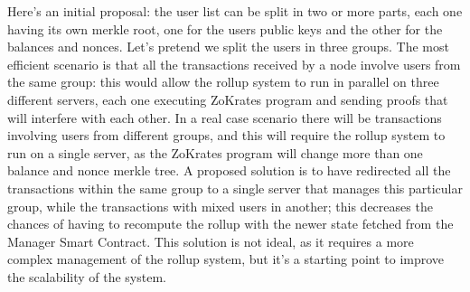Here's an initial proposal: the user list can be split in two or more parts, each one having its own merkle root, one for the users public keys and the other for the balances and nonces. Let's pretend we split the users in three groups. The most efficient scenario is that all the transactions received by a node involve users from the same group: this would allow the rollup system to run in parallel on three different servers, each one executing ZoKrates program and sending proofs that will interfere with each other. In a real case scenario there will be transactions involving users from different groups, and this will require the rollup system to run on a single server, as the ZoKrates program will change more than one balance and nonce merkle tree. A proposed solution is to have redirected all the transactions within the same group to a single server that manages this particular group, while the transactions with mixed users in another; this decreases the chances of having to recompute the rollup with the newer state fetched from the Manager Smart Contract. This solution is not ideal, as it requires a more complex management of the rollup system, but it's a starting point to improve the scalability of the system.